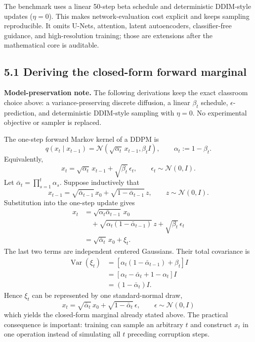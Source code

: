 \documentclass[11pt]{article}
\begin{document}
The benchmark uses a linear 50-step beta schedule and deterministic DDIM-style
updates ($\eta=0$). This makes network-evaluation cost explicit and keeps sampling
reproducible. It omits U-Nets, attention, latent autoencoders, classifier-free
guidance, and high-resolution training; those are extensions after the mathematical
core is auditable.

\subsection*{5.1 Deriving the closed-form forward marginal}

\textbf{Model-preservation note.} The following derivations keep the exact
classroom choice above: a variance-preserving discrete diffusion, a linear
$\beta_t$ schedule, $\epsilon$-prediction, and deterministic DDIM-style
sampling with $\eta=0$. No experimental objective or sampler is replaced.

The one-step forward Markov kernel of a DDPM is
\cite{ho2020ddpm}
\[
 q(x_t\mid x_{t-1})
 =\mathcal N(\sqrt{\alpha_t}\,x_{t-1},\beta_t I),
 \qquad \alpha_t:=1-\beta_t.
\]
Equivalently,
\[
 x_t=\sqrt{\alpha_t}\,x_{t-1}+\sqrt{\beta_t}\,\epsilon_t,
 \qquad \epsilon_t\sim\mathcal N(0,I).
\]
Let $\bar\alpha_t=\prod_{s=1}^t\alpha_s$. Suppose inductively that
\[
 x_{t-1}
 =\sqrt{\bar\alpha_{t-1}}\,x_0
 +\sqrt{1-\bar\alpha_{t-1}}\,z,
 \qquad z\sim\mathcal N(0,I).
\]
Substitution into the one-step update gives
\begin{align*}
 x_t
 &=\sqrt{\alpha_t\bar\alpha_{t-1}}\,x_0\\
 &\quad+
 \sqrt{\alpha_t(1-\bar\alpha_{t-1})}\,z
 +\sqrt{\beta_t}\,\epsilon_t\\
 &=\sqrt{\bar\alpha_t}\,x_0+\xi_t.
\end{align*}
The last two terms are independent centered Gaussians. Their total covariance is
\begin{align*}
 \operatorname{Var}(\xi_t)
 &=\left[\alpha_t(1-\bar\alpha_{t-1})+\beta_t\right]I\\
 &=\left[\alpha_t-\bar\alpha_t+1-\alpha_t\right]I\\
 &=(1-\bar\alpha_t)I.
\end{align*}
Hence $\xi_t$ can be represented by one standard-normal draw,
\[
 \boxed{
 x_t=\sqrt{\bar\alpha_t}\,x_0
 +\sqrt{1-\bar\alpha_t}\,\epsilon,
 \qquad \epsilon\sim\mathcal N(0,I)
 }
\]
which yields the closed-form marginal already stated above. The practical
consequence is important: training can sample an arbitrary $t$ and construct
$x_t$ in one operation instead of simulating all $t$ preceding corruption
steps.
\end{document}
